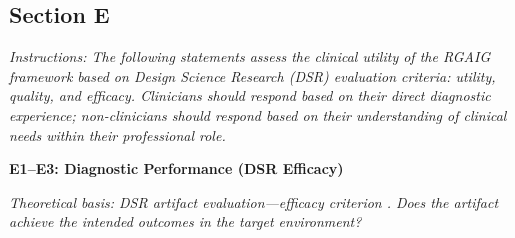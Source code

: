 
\subsection{Section E}
\label{subsec:survey_clinical}

\noindent\textit{Instructions: The following statements assess the clinical utility of the RGAIG framework based on Design Science Research (DSR) evaluation criteria: utility, quality, and efficacy. Clinicians should respond based on their direct diagnostic experience; non-clinicians should respond based on their understanding of clinical needs within their professional role.}

\noindent\textbf{E1--E3: Diagnostic Performance (DSR Efficacy)}

\noindent\textit{Theoretical basis: DSR artifact evaluation---efficacy criterion \cite{hevner2004design}. Does the artifact achieve the intended outcomes in the target environment?}

